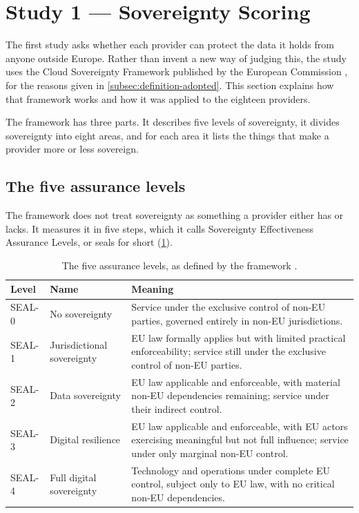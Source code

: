 \section{Study 1 --- Sovereignty Scoring}
\label{sec:method-study1}

The first study asks whether each provider can protect the data it holds from
anyone outside Europe. Rather than invent a new way of judging this, the study uses
the Cloud Sovereignty Framework published by the European Commission
\cite{EC_DIGIT_CloudSovereignty_2025}, for the reasons given in
\cref{subsec:definition-adopted}. This section explains how that framework works
and how it was applied to the eighteen providers.

The framework has three parts. It describes five levels of sovereignty, it divides
sovereignty into eight areas, and for each area it lists the things that make a
provider more or less sovereign.

\subsection*{The five assurance levels}

The framework does not treat sovereignty as something a provider either has or
lacks. It measures it in five steps, which it calls Sovereignty Effectiveness
Assurance Levels, or seals for short (\cref{tab:seal-levels}).

\begin{table}[htbp]
  \centering
  \caption{The five assurance levels, as defined by the framework
           \cite{EC_DIGIT_CloudSovereignty_2025}.}
  \label{tab:seal-levels}
  \small
  \renewcommand{\arraystretch}{1.3}
  \begin{tabularx}{\textwidth}{@{}l l X@{}}
    \toprule
    \textbf{Level} & \textbf{Name} & \textbf{Meaning} \\
    \midrule
    SEAL-0 & No sovereignty
      & Service under the exclusive control of non-\acs{EU} parties, governed
        entirely in non-\acs{EU} jurisdictions. \\
    SEAL-1 & Jurisdictional sovereignty
      & \acs{EU} law formally applies but with limited practical
        enforceability; service still under the exclusive control of
        non-\acs{EU} parties. \\
    SEAL-2 & Data sovereignty
      & \acs{EU} law applicable and enforceable, with material non-\acs{EU}
        dependencies remaining; service under their indirect control. \\
    SEAL-3 & Digital resilience
      & \acs{EU} law applicable and enforceable, with \acs{EU} actors
        exercising meaningful but not full influence; service under only
        marginal non-\acs{EU} control. \\
    SEAL-4 & Full digital sovereignty
      & Technology and operations under complete \acs{EU} control, subject only
        to \acs{EU} law, with no critical non-\acs{EU} dependencies. \\
    \bottomrule
  \end{tabularx}
\end{table}

